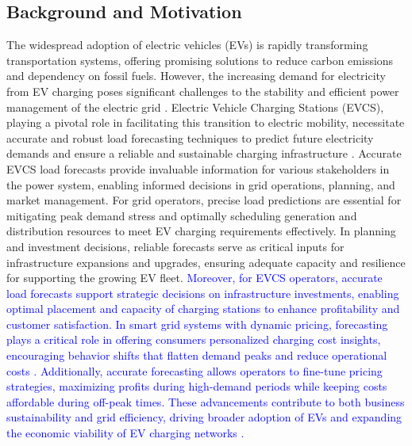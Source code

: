 \documentclass[lettersize,journal]{IEEEtran}
\newcommand{\hl}[1]{\textcolor{blue}{#1}}
\begin{document}
\subsection{Background and Motivation}
The widespread adoption of electric vehicles (EVs) is rapidly transforming transportation systems, offering promising solutions to reduce carbon emissions and dependency on fossil fuels. However, the increasing demand for electricity from EV charging poses significant challenges to the stability and efficient power management of the electric grid \cite{journal/natenergy2022/7Powell}.  Electric Vehicle Charging Stations (EVCS), playing a pivotal role in facilitating this transition to electric mobility, necessitate accurate and robust load forecasting techniques to predict future electricity demands and ensure a reliable and sustainable charging infrastructure \cite{journal/tsg2023/Jiang}.  Accurate EVCS load forecasts provide invaluable information for various stakeholders in the power system, enabling informed decisions in grid operations, planning, and market management.  For grid operators, precise load predictions are essential for mitigating peak demand stress and optimally scheduling generation and distribution resources to meet EV charging requirements effectively. In planning and investment decisions, reliable forecasts serve as critical inputs for infrastructure expansions and upgrades, ensuring adequate capacity and resilience for supporting the growing EV fleet. \hl{Moreover, for EVCS operators, accurate load forecasts support strategic decisions on infrastructure investments, enabling optimal placement and capacity of charging stations to enhance profitability and customer satisfaction. In smart grid systems with dynamic pricing, forecasting plays a critical role in offering consumers personalized charging cost insights, encouraging behavior shifts that flatten demand peaks and reduce operational costs \cite{zheng2024effects}. Additionally, accurate forecasting allows operators to fine-tune pricing strategies, maximizing profits during high-demand periods while keeping costs affordable during off-peak times.  These advancements contribute to both business sustainability and grid efficiency, driving broader adoption of EVs and expanding the economic viability of EV charging networks \cite{nezamuddin2021problem}. }
\end{document}
